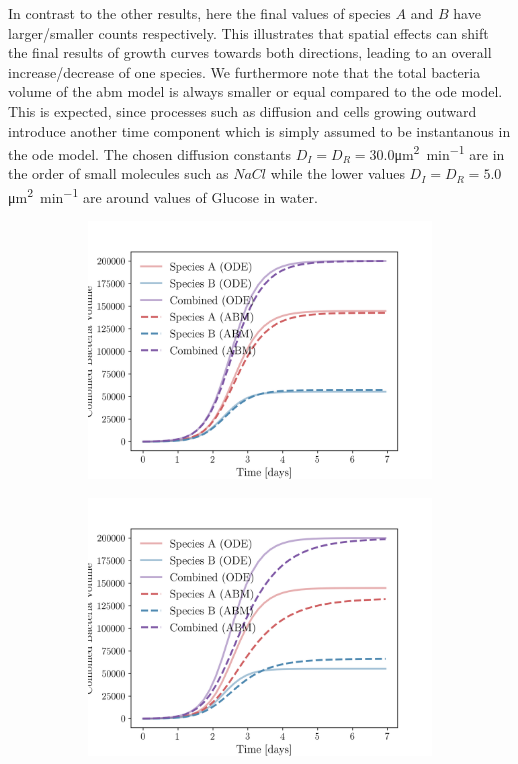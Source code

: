 \documentclass[10pt,A4paper]{article}
\numberwithin{equation}{section}
\begin{document}
In contrast to the other results, here the final values of species $A$ and $B$ have larger/smaller counts respectively.
This illustrates that spatial effects can shift the final results of growth curves towards both directions, leading to an overall increase/decrease of one species.
We furthermore note that the total bacteria volume of the \ac{abm} model is always smaller or equal compared to the \ac{ode} model.
This is expected, since processes such as diffusion and cells growing outward introduce another time component which is simply assumed to be instantanous in the \ac{ode} model.
The chosen diffusion constants $D_I=D_R=30.0$\unit{\micro\metre\squared\per\minute} are in the order of small molecules such as $NaCl$ while the lower values $D_I=D_R=5.0$\unit{\micro\metre\squared\per\minute} are around values of Glucose in water.
\begin{figure}
    \centering
    \begin{subfigure}[c]{0.5\columnwidth}
        \includegraphics[width=\columnwidth]{Figures/abm-homogenous/abm_ode_comparison.png}
    \end{subfigure}%
    \begin{subfigure}[c]{0.5\columnwidth}
        \includegraphics[width=\columnwidth]{Figures/abm-homogenous-low-diffusion/abm_ode_comparison.png}

\end{subfigure}
\end{figure}
\end{document}
